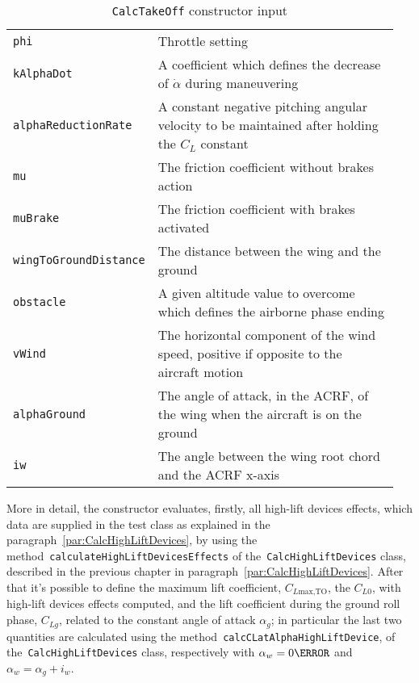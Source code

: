 \begin{table}[!t]
{\begin{tabular}{p{0.25\linewidth}p{0.7\linewidth}}
\lstinline[language=Java]!phi! & Throttle setting \\  [0.2cm]
\lstinline[language=Java]!kAlphaDot! & A coefficient which defines the decrease of $\dot\alpha$ during maneuvering \\ [0.2cm]
\lstinline[language=Java]!alphaReductionRate! & A constant negative pitching angular velocity to be maintained after holding the $C_L$ constant \\ [0.2cm]
\lstinline[language=Java]!mu! & The friction coefficient without brakes action \\ [0.2cm]
\lstinline[language=Java]!muBrake! & The friction coefficient with brakes activated \\ [0.2cm]
\lstinline[language=Java]!wingToGroundDistance! & The distance between the wing and the ground  \\ [0.2cm]
\lstinline[language=Java]!obstacle! & A given altitude value to overcome which defines the airborne phase ending \\ [0.2cm]
\lstinline[language=Java]!vWind! & The horizontal component of the wind speed, positive if opposite to the aircraft motion \\ [0.2cm]
\lstinline[language=Java]!alphaGround! & The angle of attack, in the \gls{ACRF}, of the wing when the aircraft is on the ground \\ [0.2cm]
\lstinline[language=Java]!iw! & The angle between the wing root chord and the \gls{ACRF} x-axis \\ 
\bottomrule
\end{tabular}
}
\caption{\lstinline[language=Java]!CalcTakeOff! constructor input}
\label{table:CalcTakeOffInput}
\end{table}
%
More in detail, the constructor evaluates, firstly, all high-lift devices effects, which data are supplied in the test class as explained in the paragraph~\ref{par:CalcHighLiftDevices}, by using the method~\lstinline[language=Java]!calculateHighLiftDevicesEffects! of the~\lstinline[language=Java]!CalcHighLiftDevices! class, described in the previous chapter in paragraph~\ref{par:CalcHighLiftDevices}. After that it's possible to define the maximum lift coefficient, $C_{L\text{max,TO}}$, the $C_{L0}$, with high-lift devices effects computed, and the lift coefficient during the ground roll phase, $C_{Lg}$, related to the constant angle of attack $\alpha_g$; in particular the last two quantities are calculated using the method~\lstinline[language=Java]!calcCLatAlphaHighLiftDevice!, of the~\lstinline[language=Java]!CalcHighLiftDevices! class, respectively with $\alpha_w=0\degree$ and  $\alpha_w=\alpha_g+i_w$.

